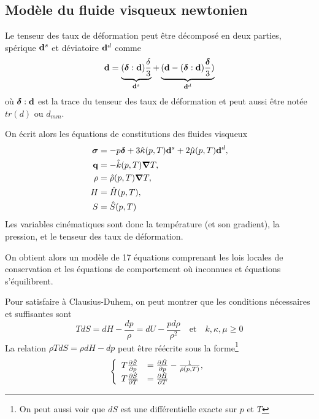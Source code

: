 \documentclass[a4paper,11pt]{report}
\newcommand{\bs}[1]{\boldsymbol{#1}}
\begin{document}
      \subsection{Modèle du fluide visqueux newtonien}
        Le tenseur des taux de déformation peut être décomposé en deux parties, spérique $\vb{d}^s$ et déviatoire $\vb{d}^d$ comme
        \begin{equation}
          \vb{d} = \underbrace{(\bs{\delta} : \vb{d}) \frac{\delta}{3}}_{\vb{d}^s} + \underbrace{(\vb{d} - (\bs{\delta}:\vb{d})\frac{\bs{\delta}}{3})}_{\vb{d}^d}
        \end{equation}
        où $\bs{\delta} : \vb{d}$ est la trace du tenseur des taux de déformation et peut aussi être notée $tr(d)$ ou $d_{mm}$.

        On écrit alors les équations de constitutions des fluides visqueux
        \begin{gather}
          \begin{aligned}
            \bs{\sigma} &= -p\bs{\delta} + 3 \hat{\kappa}(p,T) \vb{d}^s + 2 \hat{\mu}(p,T) \vb{d}^d,\\
            \vb{q} &= - \hat{k}(p, T) \grad T,\\
            \rho &= \hat{\rho}(p,T)\grad T,\\
            H &= \hat{H}(p,T),\\
            S &= \hat{S}(p,T)
          \end{aligned}
        \end{gather}
        Les variables cinématiques sont donc la température (et son gradient), la pression, et le tenseur des taux de déformation.

        On obtient alors un modèle de 17 équations comprenant les lois locales de conservation et les équations de comportement où inconnues et équations s'équilibrent.

        Pour satisfaire à Clausius-Duhem, on peut montrer que les conditions nécessaires et suffisantes sont
        \begin{equation}
          TdS = dH - \frac{dp}{\rho} = dU - \frac{pd\rho}{\rho^2}\quad \textrm{et} \quad k, \kappa, \mu \geq 0
        \end{equation}
        La relation $\rho T dS = \rho dH - dp$ peut être réécrite sous la forme\footnote{On peut aussi voir que $dS$ est une différentielle exacte sur $p$ et $T$}
        \begin{equation}
          \left\{
            \begin{array}{ll}
              T \pdv{\hat{S}}{p}(p,T) &= \pdv{\hat{H}}{p}(p, T) - \frac{1}{\hat{\rho}(p,T)},\\
              T \pdv{\hat{S}}{T}(p,T) &= \pdv{\hat{H}}{T}(p,T)
            \end{array}
          \right.
        \end{equation}
\end{document}
